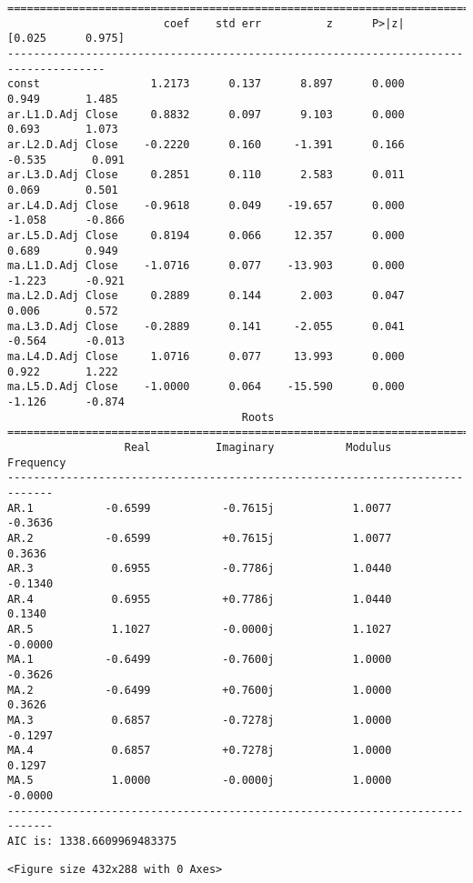 \documentclass[11pt]{article}
\begin{document}
\begin{Verbatim}[commandchars=\\\{\}]
=====================================================================================
                        coef    std err          z      P>|z|      [0.025      0.975]
-------------------------------------------------------------------------------------
const                 1.2173      0.137      8.897      0.000       0.949       1.485
ar.L1.D.Adj Close     0.8832      0.097      9.103      0.000       0.693       1.073
ar.L2.D.Adj Close    -0.2220      0.160     -1.391      0.166      -0.535       0.091
ar.L3.D.Adj Close     0.2851      0.110      2.583      0.011       0.069       0.501
ar.L4.D.Adj Close    -0.9618      0.049    -19.657      0.000      -1.058      -0.866
ar.L5.D.Adj Close     0.8194      0.066     12.357      0.000       0.689       0.949
ma.L1.D.Adj Close    -1.0716      0.077    -13.903      0.000      -1.223      -0.921
ma.L2.D.Adj Close     0.2889      0.144      2.003      0.047       0.006       0.572
ma.L3.D.Adj Close    -0.2889      0.141     -2.055      0.041      -0.564      -0.013
ma.L4.D.Adj Close     1.0716      0.077     13.993      0.000       0.922       1.222
ma.L5.D.Adj Close    -1.0000      0.064    -15.590      0.000      -1.126      -0.874
                                    Roots                                    
=============================================================================
                  Real          Imaginary           Modulus         Frequency
-----------------------------------------------------------------------------
AR.1           -0.6599           -0.7615j            1.0077           -0.3636
AR.2           -0.6599           +0.7615j            1.0077            0.3636
AR.3            0.6955           -0.7786j            1.0440           -0.1340
AR.4            0.6955           +0.7786j            1.0440            0.1340
AR.5            1.1027           -0.0000j            1.1027           -0.0000
MA.1           -0.6499           -0.7600j            1.0000           -0.3626
MA.2           -0.6499           +0.7600j            1.0000            0.3626
MA.3            0.6857           -0.7278j            1.0000           -0.1297
MA.4            0.6857           +0.7278j            1.0000            0.1297
MA.5            1.0000           -0.0000j            1.0000           -0.0000
-----------------------------------------------------------------------------
AIC is: 1338.6609969483375

    \end{Verbatim}

    
    \begin{verbatim}
<Figure size 432x288 with 0 Axes>
    \end{verbatim}
\end{document}
